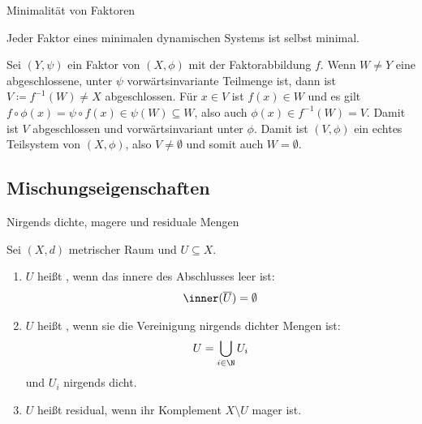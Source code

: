 \begin{lemma} Minimalität von Faktoren
  
Jeder Faktor eines minimalen dynamischen Systems ist selbst minimal.
\end{lemma}
\begin{beweis}
  Sei $(Y, \psi)$ ein Faktor von $(X, \phi)$ mit der Faktorabbildung $f$. Wenn $W \neq Y$ eine abgeschlossene, unter $\psi$ vorwärtsinvariante Teilmenge ist, dann ist $V \coloneqq f^{-1}(W) \neq X$ abgeschlossen. Für $x \in V$ ist $f(x) \in W$ und es gilt $f \circ \phi(x) = \psi \circ f(x) \in \psi(W) \subseteq W$, also auch $\phi(x) \in f^{-1}(W) = V$. Damit ist $V$ abgeschlossen und vorwärtsinvariant unter $\phi$. Damit ist $(V, \phi)$ ein echtes Teilsystem von $(X, \phi)$, also $V \neq \emptyset$ und somit auch $W = \emptyset$.
\end{beweis}

\subsection{Mischungseigenschaften}
\begin{definition}  Nirgends dichte, magere und residuale Mengen

Sei $(X, d)$ metrischer Raum und $U \subseteq X$.  
\renewcommand{\labelenumi}{(\alph{enumi})}
\begin{enumerate}
\item $U$ heißt , wenn das innere des Abschlusses leer ist:
  \begin{align*}
    \inner(\overline U) = \emptyset
  \end{align*}
\item $U$ heißt , wenn sie die Vereinigung nirgends dichter Mengen ist:
  \begin{align*}
    U = \bigcup_{i \in \N} U_i
  \end{align*}
und $U_i$ nirgends dicht.
\item $U$ heißt residual, wenn ihr Komplement $X\setminus U$ mager ist.
\end{enumerate}
\end{definition}

